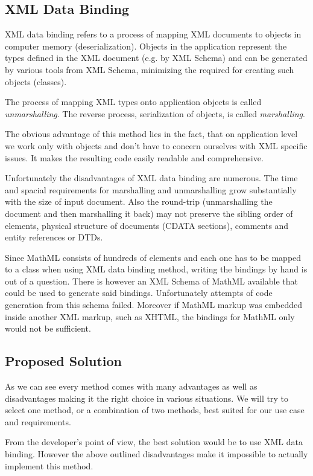 \documentclass[11pt,oneside,final]{fithesis2}
\begin{document}
\subsection{XML Data Binding} XML data binding refers to a process of mapping XML documents to objects in computer memory (deserialization). Objects in the application represent the types defined in the XML document (e.g. by XML Schema) and can be generated by various tools from XML Schema, minimizing the required for creating such objects (classes). 

The process of mapping XML types onto application objects is called \textit{unmarshalling}. The reverse process, serialization of objects, is called \textit{marshalling}. 

The obvious advantage of this method lies in the fact, that on application level we work only with objects and don't have to concern ourselves with XML specific issues. It makes the resulting code easily readable and comprehensive.

Unfortunately the disadvantages of XML data binding are numerous. The time and spacial requirements for marshalling and unmarshalling grow substantially with the size of input document. Also the round-trip (unmarshalling the document and then marshalling it back) may not preserve the sibling order of elements, physical structure of documents (CDATA sections), comments and entity references or DTDs.

Since MathML consists of hundreds of elements and each one has to be mapped to a class when using XML data binding method, writing the bindings by hand is out of a question. There is however an XML Schema of MathML available that could be used to generate said bindings. Unfortunately attempts of code generation from this schema failed. Moreover if MathML markup was embedded inside another XML markup, such as XHTML, the bindings for MathML only would not be sufficient. 

\subsection{Proposed Solution}
\label{section:inputProcessingSolution}
As we can see every method comes with many advantages as well as disadvantages making it the right choice in various situations. We will try to select one method, or a combination of two methods, best suited for our use case and requirements. 

From the developer's point of view, the best solution would be to use XML data binding. However the above outlined disadvantages make it impossible to actually implement this method.
\end{document}
